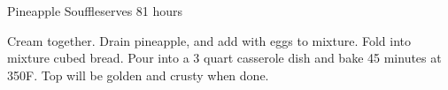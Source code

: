 \begin{recipe}{Pineapple Souffle}{serves 8}{1 hours}

  Cream together.
  Drain pineapple, and add with eggs to mixture.
  Fold into mixture cubed bread.  Pour into a 3 quart 
  casserole dish and bake 45 minutes at 350\0F.  Top will be golden and 
  crusty when done.
\end{recipe}
